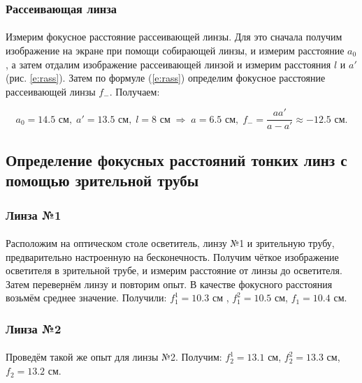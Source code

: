 \documentclass[a4paper,12pt]{article} %
\begin{document}
\subsubsection{Рассеивающая линза}

\paragraph{} Измерим фокусное расстояние рассеивающей линзы. Для это сначала получим изображение на экране при помощи собирающей линзы, и измерим расстояние $a_0$, а затем отдалим изображение рассеивающей линзой и измерим расстояния $l$ и $a'$ (рис. \ref{e:rass}). Затем по формуле (\ref{e:rass}) определим фокусное расстояние рассеивающей линзы $f_-$. Получаем:

\[
a_0 = 14.5 \text{ см}, \; a' = 13.5 \text{ см}, \; l = 8 \text{ см} \; \Rightarrow \; a = 6.5 \text{ см}, \; f_- = \frac{aa'}{a-a'} \approx -12.5 \text{ см}.
\]

\subsection{Определение фокусных расстояний тонких линз с помощью зрительной трубы}

\subsubsection{Линза №1}

\paragraph{} Расположим на оптическом столе осветитель, линзу №1 и зрительную трубу, предварительно настроенную на бесконечность. Получим чёткое изображение осветителя в зрительной трубе, и измерим расстояние от линзы до осветителя. Затем перевернём линзу и повторим опыт. В качестве фокусного расстояния возьмём среднее значение. Получили: $f_1^1 = 10.3$ см , $f_1^2 = 10.5$ см, $f_1 = 10.4$ см.

\subsubsection{Линза №2}

\paragraph{} Проведём такой же опыт для линзы №2. Получим: $f_2^1 = 13.1$ см, $f_2^2 = 13.3$ см, $f_2 = 13.2$ см.
\end{document}

